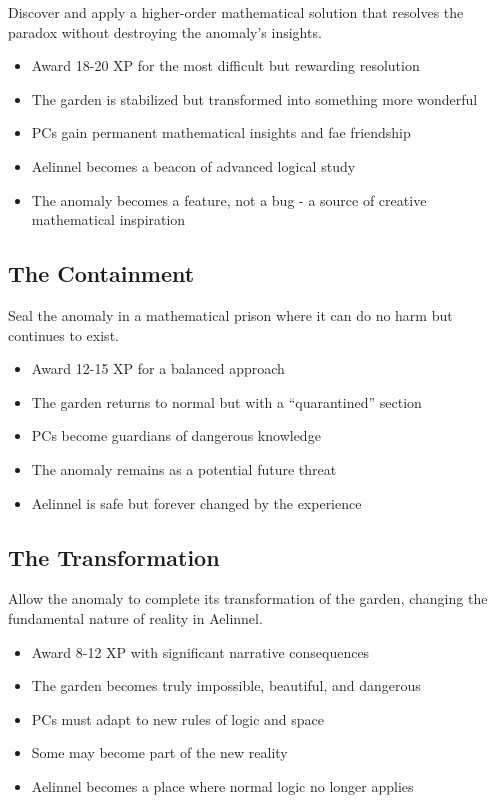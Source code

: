 \documentclass[11pt]{article}
\begin{document}
Discover and apply a higher-order mathematical solution that resolves the paradox without destroying the anomaly's insights.
\begin{itemize}
\item Award 18-20 XP for the most difficult but rewarding resolution
\item The garden is stabilized but transformed into something more wonderful
\item PCs gain permanent mathematical insights and fae friendship
\item Aelinnel becomes a beacon of advanced logical study
\item The anomaly becomes a feature, not a bug - a source of creative mathematical inspiration
\end{itemize}

\subsection{The Containment}

Seal the anomaly in a mathematical prison where it can do no harm but continues to exist.
\begin{itemize}
\item Award 12-15 XP for a balanced approach
\item The garden returns to normal but with a ``quarantined'' section
\item PCs become guardians of dangerous knowledge
\item The anomaly remains as a potential future threat
\item Aelinnel is safe but forever changed by the experience
\end{itemize}

\subsection{The Transformation}

Allow the anomaly to complete its transformation of the garden, changing the fundamental nature of reality in Aelinnel.
\begin{itemize}
\item Award 8-12 XP with significant narrative consequences
\item The garden becomes truly impossible, beautiful, and dangerous
\item PCs must adapt to new rules of logic and space
\item Some may become part of the new reality
\item Aelinnel becomes a place where normal logic no longer applies
\end{itemize}
\end{document}
